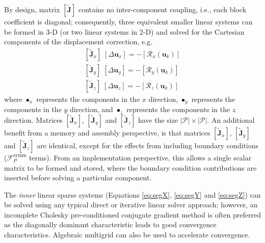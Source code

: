 \documentclass[sn-mathphys,Numbered]{sn-jnl}%
\newcommand{\bb}{\boldsymbol}
\begin{document}
By design, matrix $\left[ \bb{\tilde{J}} \right]$  contains no inter-component coupling, i.e., each block coefficient is diagonal; consequently, three equivalent smaller linear systems can be formed in 3-D (or two linear systems in 2-D) and solved for the Cartesian components of the displacement correction, e.g.
\begin{eqnarray} \label{eq:SegSysX}
     \left[ \bb{\tilde{J}}_x \right]  \;  \left[ \Delta \bb{u}_x \right] = - \left[ \mathcal{R}_x(\bb{u}_k) \right] \label{eq:segX} \\
     \left[ \bb{\tilde{J}}_y \right]  \;  \left[ \Delta \bb{u}_y \right] = - \left[ \mathcal{R}_y(\bb{u}_k) \right] \label{eq:segY} \\
     \left[ \bb{\tilde{J}}_z \right]  \;  \left[ \Delta \bb{u}_z \right] = - \left[ \mathcal{R}_z(\bb{u}_k) \right] \label{eq:segZ}
\end{eqnarray}
where $ \bullet_x$ represents the components in the $x$ direction, $ \bullet_y$ represents the components in the $y$ direction, and $ \bullet_z$ represents the components in the $z$ direction.
Matrices $\left[ \bb{\tilde{J}}_x \right]$, $ \left[ \bb{\tilde{J}}_y\right]$ and $\left[ \bb{\tilde{J}}_z\right]$ have the size $|\mathcal{P}| \times |\mathcal{P}|$.
An additional benefit from a memory and assembly perspective, is that matrices $\left[ \bb{\tilde{J}}_x \right]$, $ \left[ \bb{\tilde{J}}_y\right]$ and $\left[ \bb{\tilde{J}}_z\right]$ are identical, except for the effects from including boundary conditions ($\mathcal{F}^{\text{symm}}_P$ terms).
From an implementation perspective, this allows a single scalar matrix to be formed and stored, where the boundary condition contributions are inserted before solving a particular component.

The \emph{inner} linear sparse systems (Equations \ref{eq:segX}, \ref{eq:segY} and \ref{eq:segZ}) can be solved using any typical direct or iterative linear solver approach; however, an incomplete Cholesky pre-conditioned conjugate gradient method \cite{Jacobs1986} is often preferred as the diagonally dominant characteristic leads to good convergence characteristics.
Algebraic multigrid can also be used to accelerate convergence.
\end{document}
